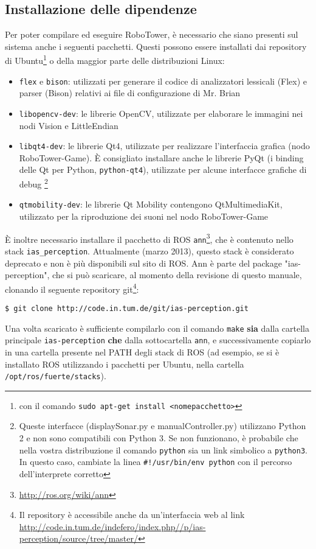 \subsection*{Installazione delle dipendenze} Per poter compilare ed eseguire RoboTower, è necessario che siano presenti sul sistema anche i seguenti pacchetti. Questi possono essere installati dai repository di Ubuntu\footnote{con il comando \texttt{sudo apt-get install <nomepacchetto>}} o della maggior parte delle distribuzioni Linux:
\begin{itemize}
\item \verb|flex| e \verb|bison|: utilizzati per generare il codice di analizzatori lessicali (Flex) e parser (Bison) relativi ai file di configurazione di Mr. Brian
\item \verb|libopencv-dev|: le librerie OpenCV, utilizzate per elaborare le immagini nei nodi Vision e LittleEndian
\item \verb|libqt4-dev|: le librerie Qt4, utilizzate per realizzare l'interfaccia grafica (nodo RoboTower-Game). È consigliato installare anche le librerie PyQt (i binding delle Qt per Python, \verb|python-qt4|), utilizzate per alcune interfacce grafiche di debug \footnote{Queste interfacce (\textsf{displaySonar.py} e \textsf{manualController.py}) utilizzano Python 2 e non sono compatibili con Python 3. Se non funzionano, è probabile che nella vostra distribuzione il comando \texttt{python} sia un link simbolico a \texttt{python3}. In questo caso, cambiate la linea \texttt{\#!/usr/bin/env python} con il percorso dell'interprete corretto}
\item \verb|qtmobility-dev|: le librerie Qt Mobility contengono QtMultimediaKit, utilizzato per la riproduzione dei suoni nel nodo RoboTower-Game
\end{itemize}

È inoltre necessario installare il pacchetto di ROS \verb|ann|\footnote{\url{http://ros.org/wiki/ann}}, che è contenuto nello stack \texttt{ias\_perception}. Attualmente (marzo 2013), questo stack è considerato deprecato e non è più disponibili sul sito di ROS. Ann è parte del package "ias-perception", che si può scaricare, al momento della revisione di questo manuale, clonando il seguente repository git\footnote{Il repository è accessibile anche da un'interfaccia web al link \url{http://code.in.tum.de/indefero/index.php//p/ias-perception/source/tree/master/}}:
\begin{verbatim}
$ git clone http://code.in.tum.de/git/ias-perception.git
\end{verbatim}
Una volta scaricato è sufficiente compilarlo con il comando \verb|make| \textbf{sia} dalla cartella principale \verb|ias-perception| \textbf{che} dalla sottocartella \verb|ann|, e successivamente copiarlo in una cartella presente nel PATH degli stack di ROS (ad esempio, se si è installato ROS utilizzando i pacchetti per Ubuntu, nella cartella \verb|/opt/ros/fuerte/stacks|).

